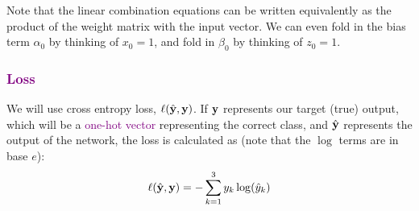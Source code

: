 Note that the linear combination equations can be written equivalently as the product of the weight matrix with the input vector. We can even fold in the bias term $\alpha_0$ by thinking of $x_0 = 1$, and fold in $\beta_0$ by thinking of $z_0 = 1$.

\subsubsection*{\textcolor{purple}{Loss}}

We will use cross entropy loss, $\ell(\hat{\mathbf{y}},\mathbf{y})$. If $\mathbf{y}$ represents our target (true) output, which will be a \textcolor{purple}{one-hot vector} representing the correct class, and $\hat{\mathbf{y}}$ represents the output of the network, the loss is calculated as (note that the $\log$ terms are in base $e$):
\begin{equation}
   \ell(\hat{\mathbf{y}},\mathbf{y}) = - \sum_{k=1}^3 y_k \log(\hat{y}_k)
\end{equation}

